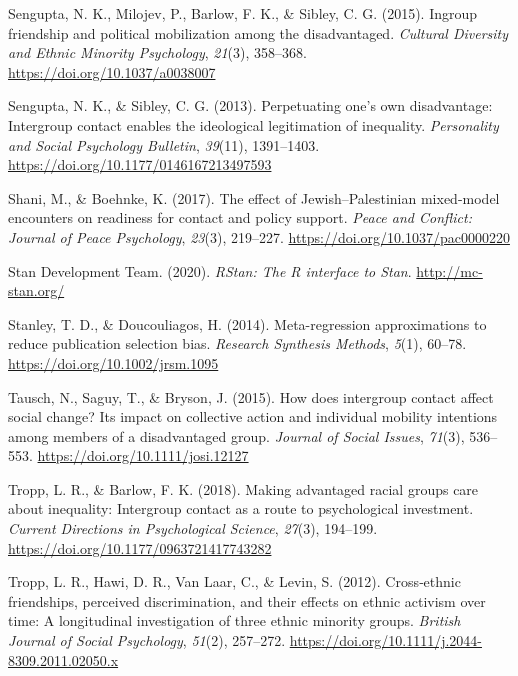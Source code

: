 \documentclass[twocolumn, 11pt, letterpaper]{article}
\begin{document}
\leavevmode\hypertarget{ref-sengupta_ingroup_2015}{}%
Sengupta, N. K., Milojev, P., Barlow, F. K., \& Sibley, C. G. (2015).
Ingroup friendship and political mobilization among the disadvantaged.
\emph{Cultural Diversity and Ethnic Minority Psychology}, \emph{21}(3),
358--368. \url{https://doi.org/10.1037/a0038007}

\leavevmode\hypertarget{ref-sengupta_perpetuating_2013}{}%
Sengupta, N. K., \& Sibley, C. G. (2013). Perpetuating one's own
disadvantage: Intergroup contact enables the ideological legitimation of
inequality. \emph{Personality and Social Psychology Bulletin},
\emph{39}(11), 1391--1403.
\url{https://doi.org/10.1177/0146167213497593}

\leavevmode\hypertarget{ref-shani_effect_2017}{}%
Shani, M., \& Boehnke, K. (2017). The effect of Jewish--Palestinian
mixed-model encounters on readiness for contact and policy support.
\emph{Peace and Conflict: Journal of Peace Psychology}, \emph{23}(3),
219--227. \url{https://doi.org/10.1037/pac0000220}

\leavevmode\hypertarget{ref-stan_development_team_rstan:_2020}{}%
Stan Development Team. (2020). \emph{RStan: The R interface to Stan}.
\url{http://mc-stan.org/}

\leavevmode\hypertarget{ref-stanley_meta-regression_2014}{}%
Stanley, T. D., \& Doucouliagos, H. (2014). Meta-regression
approximations to reduce publication selection bias. \emph{Research
Synthesis Methods}, \emph{5}(1), 60--78.
\url{https://doi.org/10.1002/jrsm.1095}

\leavevmode\hypertarget{ref-tausch_how_2015}{}%
Tausch, N., Saguy, T., \& Bryson, J. (2015). How does intergroup contact
affect social change? Its impact on collective action and individual
mobility intentions among members of a disadvantaged group.
\emph{Journal of Social Issues}, \emph{71}(3), 536--553.
\url{https://doi.org/10.1111/josi.12127}

\leavevmode\hypertarget{ref-tropp_making_2018}{}%
Tropp, L. R., \& Barlow, F. K. (2018). Making advantaged racial groups
care about inequality: Intergroup contact as a route to psychological
investment. \emph{Current Directions in Psychological Science},
\emph{27}(3), 194--199. \url{https://doi.org/10.1177/0963721417743282}

\leavevmode\hypertarget{ref-tropp_crossethnic_2012}{}%
Tropp, L. R., Hawi, D. R., Van Laar, C., \& Levin, S. (2012).
Cross‐ethnic friendships, perceived discrimination, and their effects on
ethnic activism over time: A longitudinal investigation of three ethnic
minority groups. \emph{British Journal of Social Psychology},
\emph{51}(2), 257--272.
\url{https://doi.org/10.1111/j.2044-8309.2011.02050.x}
\end{document}

